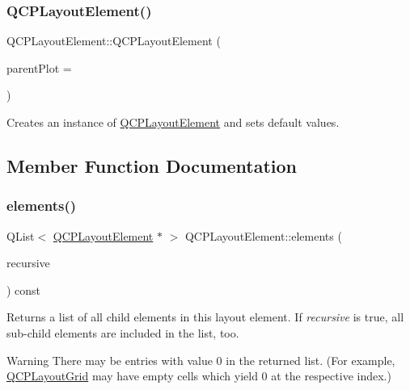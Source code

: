 \subsubsection{\texorpdfstring{Q\+C\+P\+Layout\+Element()}{QCPLayoutElement()}}
{\footnotesize\ttfamily Q\+C\+P\+Layout\+Element\+::\+Q\+C\+P\+Layout\+Element (\begin{DoxyParamCaption}\item[{\hyperlink{class_q_custom_plot}{Q\+Custom\+Plot} $\ast$}]{parent\+Plot = {} }\end{DoxyParamCaption})\hspace{0.3cm}{\ttfamily [explicit]}}

Creates an instance of \hyperlink{class_q_c_p_layout_element}{Q\+C\+P\+Layout\+Element} and sets default values. 

\subsection{Member Function Documentation}
\mbox{\label{class_q_c_p_layout_element_a76dec8cb31e498994a944d7647a43309}} 
\subsubsection{\texorpdfstring{elements()}{elements()}}
{\footnotesize\ttfamily Q\+List$<$ \hyperlink{class_q_c_p_layout_element}{Q\+C\+P\+Layout\+Element} $\ast$ $>$ Q\+C\+P\+Layout\+Element\+::elements (\begin{DoxyParamCaption}\item[{bool}]{recursive }\end{DoxyParamCaption}) const\hspace{0.3cm}{\ttfamily [virtual]}}

Returns a list of all child elements in this layout element. If {\itshape recursive} is true, all sub-\/child elements are included in the list, too.

\begin{DoxyWarning}{Warning}
There may be entries with value 0 in the returned list. (For example, \hyperlink{class_q_c_p_layout_grid}{Q\+C\+P\+Layout\+Grid} may have empty cells which yield 0 at the respective index.) 
\end{DoxyWarning}


